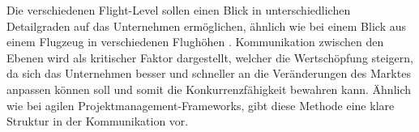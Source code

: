 Die verschiedenen Flight-Level sollen einen Blick in unterschiedlichen Detailgraden auf das Unternehmen ermöglichen, ähnlich wie bei einem Blick aus einem Flugzeug in verschiedenen Flughöhen \cite{}. Kommunikation zwischen den Ebenen wird als kritischer Faktor dargestellt, welcher die Wertschöpfung steigern, da sich das Unternehmen besser und schneller an die Veränderungen des Marktes anpassen können soll und somit die Konkurrenzfähigkeit bewahren kann. Ähnlich wie bei agilen Projektmanagement-Frameworks, gibt diese Methode eine klare Struktur in der Kommunikation vor.